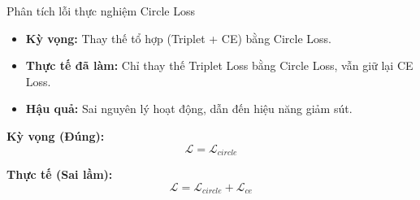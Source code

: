 \begin{frame}{Phân tích lỗi thực nghiệm Circle Loss}
    \begin{itemize}
        \item \textbf{Kỳ vọng:} Thay thế tổ hợp (Triplet + CE) bằng Circle Loss.
        \item \textbf{Thực tế đã làm:} Chỉ thay thế Triplet Loss bằng Circle Loss, vẫn giữ lại CE Loss.
        \item \textbf{Hậu quả:} Sai nguyên lý hoạt động, dẫn đến hiệu năng giảm sút.
    \end{itemize}
\vspace{0.5cm}
    \textbf{Kỳ vọng (Đúng):}
    \begin{equation}
        \mathcal{L} = \mathcal{L}_{circle}
    \end{equation}

    \textbf{Thực tế (Sai lầm):}
    \begin{equation}
        \mathcal{L} = \mathcal{L}_{circle} + \mathcal{L}_{ce}
    \end{equation}
\end{frame}
